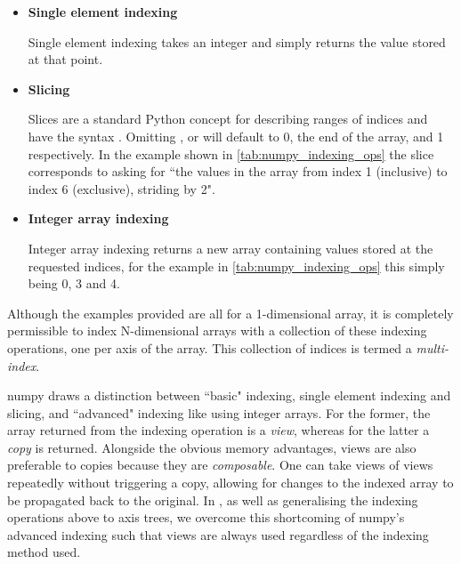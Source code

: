 \documentclass[thesis]{subfiles}
\begin{document}
\begin{itemize}
  \item \textbf{Single element indexing}

    Single element indexing takes an integer and simply returns the value stored at that point.

  \item \textbf{Slicing}

    Slices are a standard Python concept for describing ranges of indices and have the syntax .
    Omitting ,  or  will default to 0, the end of the array, and 1 respectively.
    In the example shown in \cref{tab:numpy_indexing_ops} the slice \pycode{[1:6:2]} corresponds to asking for ``the values in the array from index 1 (inclusive) to index 6 (exclusive), striding by 2".

  \item \textbf{Integer array indexing}

    Integer array indexing returns a new array containing values stored at the requested indices, for the example in \cref{tab:numpy_indexing_ops} this simply being 0, 3 and 4.

\end{itemize}

Although the examples provided are all for a 1-dimensional array, it is completely permissible to index N-dimensional arrays with a collection of these indexing operations, one per axis of the array.
This collection of indices is termed a \textit{multi-index}.

numpy draws a distinction between ``basic" indexing, single element indexing and slicing, and ``advanced" indexing like using integer arrays.
For the former, the array returned from the indexing operation is a \textit{view}, whereas for the latter a \textit{copy} is returned.
Alongside the obvious memory advantages, views are also preferable to copies because they are \textit{composable}.
One can take views of views repeatedly without triggering a copy, allowing for changes to the indexed array to be propagated back to the original.
In , as well as generalising the indexing operations above to axis trees, we overcome this shortcoming of numpy's advanced indexing such that views are always used regardless of the indexing method used.
\end{document}
